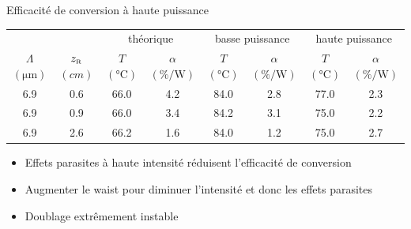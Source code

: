 \documentclass{beamer}
\newcommand{\zr}{z_\mathsc{R}}
\begin{document}
\begin{frame}{Efficacité de conversion à haute puissance}

\small
\setlength{\tabcolsep}{2.3pt}
\hspace*{-0.5cm}
\begin{tabular}{@{}cccccccc@{}} \toprule
 &  & \multicolumn{2}{c}{théorique} & \multicolumn{2}{c}{basse puissance} & \multicolumn{2}{c}{haute puissance} \\ 
 \cmidrule(r){3-4} \cmidrule(lr){5-6} \cmidrule(l){7-8} 
 $\Lambda$ $(\unit{\micro\meter})$ & $\zr$ $(\unit{cm})$ & $T$ $(\unit{\celsius})$ & $\alpha$ $(\unit{\percent\per\watt})$& $T$ $(\unit{\celsius})$ & $\alpha$ $(\unit{\percent\per\watt})$ & $T$ $(\unit{\celsius})$ & $\alpha$ $(\unit{\percent\per\watt})$   \\ \midrule
 6.9       & 0.6  & 66.0  & 4.2      & 84.0 & 2.8      & 77.0 & 2.3      \\
 6.9       & 0.9  & 66.0  & 3.4      & 84.2 & 3.1      & 75.0 & 2.2      \\
 6.9       & 2.6  & 66.2  & 1.6      & 84.0 & 1.2      & 75.0   & 2.7      \\ \bottomrule 
\end{tabular}
\normalsize
\begin{itemize}[<+->]
\item Effets parasites à haute intensité réduisent l'efficacité de conversion
\item Augmenter le waist pour diminuer l'intensité et donc les effets parasites
\item Doublage extrêmement instable
\end{itemize}
\end{frame}
\end{document}
